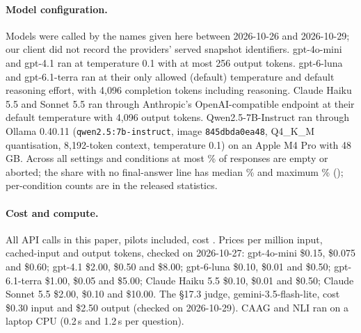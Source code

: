 \paragraph{Model configuration.} Models were called by the names given here between 2026-10-26 and 2026-10-29;
our client did not record the providers' served snapshot identifiers. gpt-4o-mini and gpt-4.1 ran at temperature 0.1
with at most 256 output tokens. gpt-6-luna and gpt-6.1-terra ran at their only allowed (default) temperature and default
reasoning effort, with 4,096 completion tokens including reasoning. Claude Haiku 5.5 and Sonnet 5.5 ran through
Anthropic's OpenAI-compatible endpoint at their default temperature with 4,096 output tokens. Qwen2.5-7B-Instruct ran
through Ollama 0.40.11 (\texttt{qwen2.5:7b-instruct}, image \texttt{845dbda0ea48}, Q4\_K\_M quantisation, 8,192-token
context, temperature 0.1) on an Apple M4 Pro with 48\,GB. Across all settings and conditions at most \truncMaxEmpty\% of
responses are empty or aborted; the share with no final-answer line has median \truncMedNoFinal\% and maximum
\truncMaxNoFinal\% (\truncMaxAt); per-condition counts are in the released statistics.

\paragraph{Cost and compute.} All API calls in this paper, pilots included, cost \totalSpend. Prices per million input, cached-input and output tokens, checked on 2026-10-27: gpt-4o-mini \$0.15, \$0.075 and \$0.60; gpt-4.1 \$2.00, \$0.50 and \$8.00; gpt-6-luna \$0.10, \$0.01 and \$0.50; gpt-6.1-terra \$1.00, \$0.05 and \$5.00; Claude Haiku 5.5 \$0.10, \$0.01 and
\$0.50; Claude Sonnet 5.5 \$2.00, \$0.10 and \$10.00. The \S17.3 judge, gemini-3.5-flash-lite, cost \$0.30 input and \$2.50 output (checked on 2026-10-29). CAAG and NLI ran on a
laptop CPU (0.2\,s and 1.2\,s per question).
